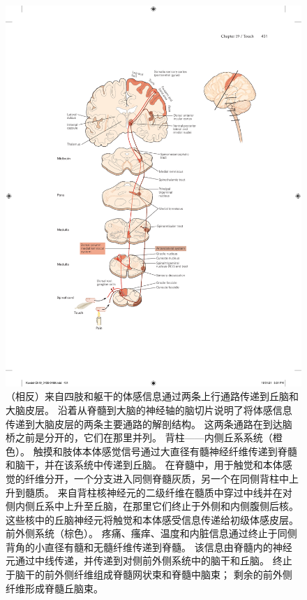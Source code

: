 \begin{figure}[htbp]
	\centering
	\includegraphics[width=1.0\linewidth]{chap19/fig_19_11}
	\caption{（相反）来自四肢和躯干的体感信息通过两条上行通路传递到丘脑和大脑皮层。
		沿着从脊髓到大脑的神经轴的脑切片说明了将体感信息传递到大脑皮层的两条主要通路的解剖结构。
		这两条通路在到达脑桥之前是分开的，它们在那里并列。
		背柱——内侧丘系系统（橙色）。
		触摸和肢体本体感觉信号通过大直径有髓神经纤维传递到脊髓和脑干，并在该系统中传递到丘脑。
		在脊髓中，用于触觉和本体感觉的纤维分开，一个分支进入同侧脊髓灰质，另一个在同侧背柱中上升到髓质。 
		来自背柱核神经元的二级纤维在髓质中穿过中线并在对侧内侧丘系中上升至丘脑，在那里它们终止于外侧和内侧腹侧后核。
		这些核中的丘脑神经元将触觉和本体感受信息传递给初级体感皮层。 前外侧系统（棕色）。
		疼痛、瘙痒、温度和内脏信息通过终止于同侧背角的小直径有髓和无髓纤维传递到脊髓。
		该信息由脊髓内的神经元通过中线传递，并传递到对侧前外侧系统中的脑干和丘脑。
		终止于脑干的前外侧纤维组成脊髓网状束和脊髓中脑束； 剩余的前外侧纤维形成脊髓丘脑束。}
	\label{fig:19_11}
\end{figure}



